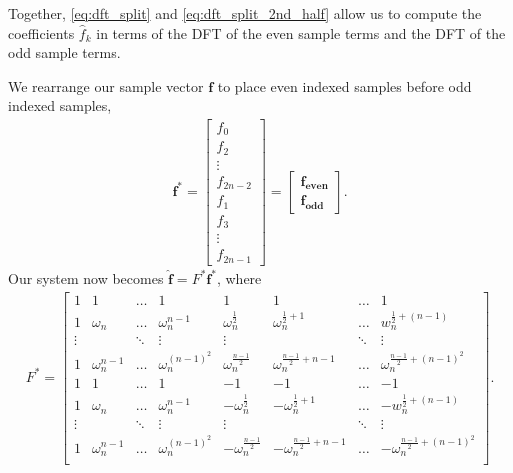 \documentclass[10pt]{article}
\renewcommand{\vec}{\mathbf}
\begin{document}
Together, \eqref{eq:dft_split} and \eqref{eq:dft_split_2nd_half} allow us to compute the coefficients \(\hat{f}_k\) in terms of the DFT of the even sample terms and the DFT of the odd sample terms.

We rearrange our sample vector \(\vec{f}\) to place even indexed samples before odd indexed samples,
\begin{align*}
    \vec{f}^* = \begin{bmatrix}
        f_0 \\ f_2 \\ \vdots \\ f_{2n-2} \\ f_1 \\ f_3 \\ \vdots \\ f_{2n-1}
    \end{bmatrix} = \begin{bmatrix}
        \vec{f_{even}} \\ \vec{f_{odd}}
    \end{bmatrix}.
\end{align*} Our system now becomes \(\hat{\vec{f}} = F^* \vec{f}^*\), where \begin{align*}
    F^* = \begin{bmatrix}
        1 & 1              & \dots & 1                   
            & 1                        & 1                              & \dots & 1 \\
        1 & \omega_n       & \dots & \omega_n^{n-1}      
            & \omega_n^{\frac{1}{2}}   & \omega_n^{\frac{1}{2}+1}       & \dots & w_n^{\frac{1}{2}+(n-1)} \\
        \vdots &           & \ddots & \vdots             
            & \vdots                   &                                & \ddots & \vdots \\
        1 & \omega_n^{n-1} & \dots  & \omega_n^{(n-1)^2}
            & \omega_n^{\frac{n-1}{2}} & \omega_n^{\frac{n-1}{2} + n-1} & \dots & \omega_n^{\frac{n-1}{2} + (n-1)^2} \\
        1 & 1              & \dots & 1                   
            & -1                        & -1                              & \dots & -1 \\
        1 & \omega_n       & \dots & \omega_n^{n-1}      
            & -\omega_n^{\frac{1}{2}}   & -\omega_n^{\frac{1}{2}+1}       & \dots & -w_n^{\frac{1}{2}+(n-1)} \\
        \vdots &           & \ddots & \vdots             
            & \vdots                   &                                & \ddots & \vdots \\
        1 & \omega_n^{n-1} & \dots  & \omega_n^{(n-1)^2}
            & -\omega_n^{\frac{n-1}{2}} & -\omega_n^{\frac{n-1}{2} + n-1} & \dots & -\omega_n^{\frac{n-1}{2} + (n-1)^2} \\
    \end{bmatrix}.
\end{align*}
\end{document}
